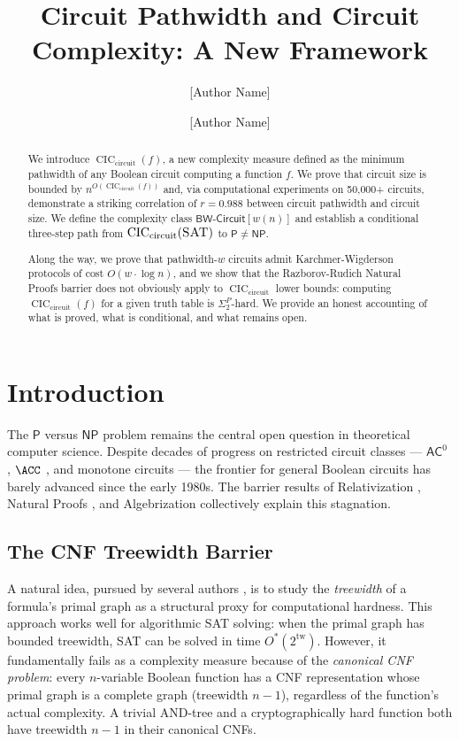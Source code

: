 \documentclass[11pt]{article}
\title{\bf Circuit Pathwidth and Circuit Complexity: A New Framework}
\author{[Author Name] \and [Author Name]}
\date{}
\theoremstyle{plain}
\theoremstyle{definition}
\newcommand{\tw}{\operatorname{tw}}
\newcommand{\CIC}{\operatorname{CIC}}
\newcommand{\CICcirc}{\CIC_{\text{circuit}}}
\newcommand{\SAT}{\textsc{SAT}}
\newcommand{\Pclass}{\mathsf{P}}
\newcommand{\NP}{\mathsf{NP}}
\newcommand{\AC}{\mathsf{AC}}
\newcommand{\BWCircuit}{\mathsf{BW\text{-}Circuit}}
\begin{document}
\maketitle

\begin{abstract}
We introduce $\CICcirc(f)$, a new complexity measure defined as the minimum pathwidth of any Boolean circuit computing a function $f$. We prove that circuit size is bounded by $n^{O(\CICcirc(f))}$ and, via computational experiments on 50{,}000+ circuits, demonstrate a striking correlation of $r=0.988$ between circuit pathwidth and circuit size. We define the complexity class $\BWCircuit[w(n)]$ and establish a conditional three-step path from $\CICcirc(\SAT)$ to $\Pclass \neq \NP$.

Along the way, we prove that pathwidth-$w$ circuits admit Karchmer-Wigderson protocols of cost $O(w \cdot \log n)$, and we show that the Razborov-Rudich Natural Proofs barrier does not obviously apply to $\CICcirc$ lower bounds: computing $\CICcirc(f)$ for a given truth table is $\Sigma_2^P$-hard. We provide an honest accounting of what is proved, what is conditional, and what remains open.
\end{abstract}

\section{Introduction}\label{sec:intro}

The $\Pclass$ versus $\NP$ problem remains the central open question in theoretical computer science. Despite decades of progress on restricted circuit classes --- $\AC^0$ \cite{FSS84,Ajtai83,Hastad86}, $\ACC$ \cite{Williams14}, and monotone circuits \cite{Razborov85} --- the frontier for general Boolean circuits has barely advanced since the early 1980s. The barrier results of Relativization \cite{BakerGS75}, Natural Proofs \cite{RazborovRudich97}, and Algebrization \cite{AaronsonWigderson09} collectively explain this stagnation.

\subsection{The CNF Treewidth Barrier}

A natural idea, pursued by several authors \cite{SamerSzeider10,AtseriasDalmu05}, is to study the \emph{treewidth} of a formula's primal graph as a structural proxy for computational hardness. This approach works well for algorithmic SAT solving: when the primal graph has bounded treewidth, SAT can be solved in time $O^*(2^{\tw})$. However, it fundamentally fails as a complexity measure because of the \emph{canonical CNF problem}: every $n$-variable Boolean function has a CNF representation whose primal graph is a complete graph (treewidth $n-1$), regardless of the function's actual complexity. A trivial AND-tree and a cryptographically hard function both have treewidth $n-1$ in their canonical CNFs.
\end{document}
